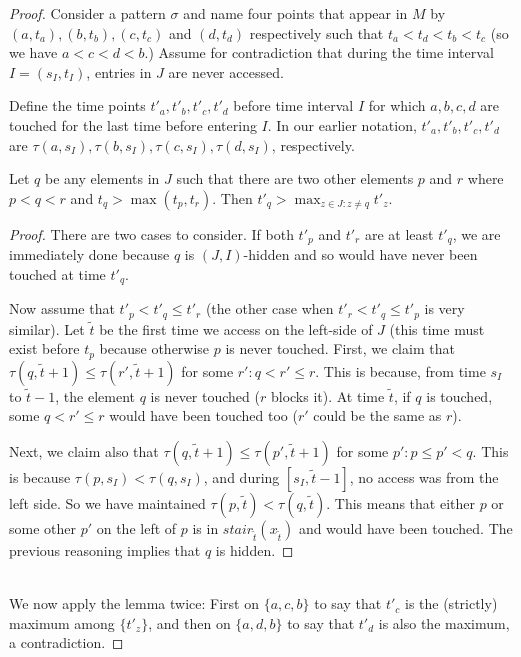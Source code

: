 \begin{proof}
Consider a pattern $\sigma$ and name four points that appear in $M$ by $(a,t_a), (b,t_b), (c,t_c)$ and $(d, t_d)$ respectively such that $t_a < t_d< t_b < t_c$ (so we have $a < c < d <b$.) 
Assume for contradiction that during the time interval $I = (s_I, t_I)$, entries in $J$ are never accessed.    

Define the time points $t'_a, t'_b, t'_c, t'_d$ before time interval $I$ for which $a,b,c,d$ are touched for the last time before entering $I$. 
In our earlier notation, $t'_a, t'_b, t'_c, t'_d$ are  $\tau(a, s_I), \tau(b,s_I), \tau(c,s_I), \tau(d,s_I)$, respectively.  


\begin{lemma} 
Let $q$ be any elements in $J$ such that there are two other elements $p$ and $r$ where $p < q <r$ and $t_q > \max (t_p,t_r)$. Then  
$t'_q > \max_{z \in J: z \neq q} t'_z$. 
\end{lemma} 
\begin{proof} 
There are two cases to consider. 
If both $t'_p$ and  $t'_r$ are at least $t'_q$, we are immediately done because $q$ is $(J, I)$-hidden and so would have never been touched at time $t'_q$. 


 
Now assume that $t'_p < t'_q \leq t'_r$ (the other case when $t'_r < t'_q \leq t'_p$ is very similar). 
Let $\tilde t$ be the first time we access on the left-side of $J$ (this time must exist before $t_p$ because otherwise $p$ is never touched. 
First, we claim that $\tau(q, \tilde t+1) \leq \tau(r',\tilde t+1)$ for some $r': q<r' \leq r$. This is because, from time $s_I$ to $\tilde t -1$, the element $q$ is never touched ($r$ blocks it).   
At time $\tilde t$, if $q$ is touched, some $q < r' \leq r$ would have been touched too ($r'$ could be the same as $r$).

Next, we claim also that $\tau(q, \tilde t+1) \leq \tau(p', \tilde t +1)$ for some $p': p \leq p' <q$. This is because $\tau(p, s_I) < \tau(q,s_I)$, and during $[s_I, \tilde t - 1]$, no access was from the left side. 
So we have maintained $\tau(p, \tilde t) < \tau(q, \tilde t)$.   
This means that either $p$ or some other $p'$ on the left of $p$ is in $stair_{\tilde t}(x_{\tilde t})$ and would have been touched.  
The previous reasoning implies that $q$ is hidden.  

\end{proof} 
\ \\
We now apply the lemma twice: First on $\{a, c, b\}$ to say that $t'_c$ is the (strictly) maximum among $\{t'_z\}$, and then on $\{a,d,b\}$ to say that $t'_d$ is also the maximum, a contradiction.  
\end{proof} 


